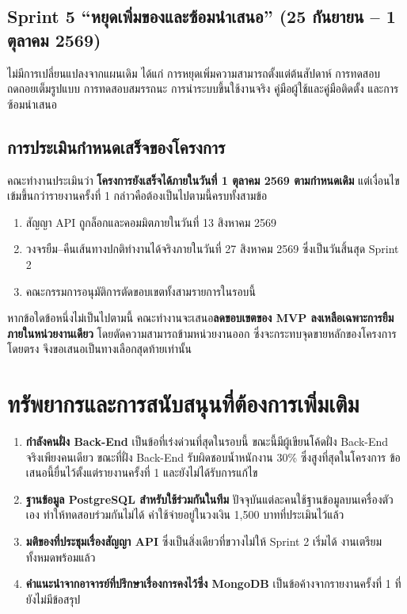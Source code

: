 \subsection{Sprint 5 ``หยุดเพิ่มของและซ้อมนำเสนอ'' (25 กันยายน – 1 ตุลาคม 2569)}

ไม่มีการเปลี่ยนแปลงจากแผนเดิม ได้แก่ การหยุดเพิ่มความสามารถตั้งแต่ต้นสัปดาห์ การทดสอบถดถอยเต็มรูปแบบ การทดสอบสมรรถนะ การนำระบบขึ้นใช้งานจริง คู่มือผู้ใช้และคู่มือติดตั้ง และการซ้อมนำเสนอ

\subsection{การประเมินกำหนดเสร็จของโครงการ}

คณะทำงานประเมินว่า \textbf{โครงการยังเสร็จได้ภายในวันที่ 1 ตุลาคม 2569 ตามกำหนดเดิม} แต่เงื่อนไขเข้มขึ้นกว่ารายงานครั้งที่ 1 กล่าวคือต้องเป็นไปตามนี้ครบทั้งสามข้อ

\begin{enumerate}
  \item สัญญา API ถูกล็อกและคอมมิตภายในวันที่ 13 สิงหาคม 2569
  \item วงจรยืม–คืนเส้นทางปกติทำงานได้จริงภายในวันที่ 27 สิงหาคม 2569 ซึ่งเป็นวันสิ้นสุด Sprint 2
  \item คณะกรรมการอนุมัติการตัดขอบเขตทั้งสามรายการในรอบนี้
\end{enumerate}

\noindent หากข้อใดข้อหนึ่งไม่เป็นไปตามนี้ คณะทำงานจะเสนอ\textbf{ลดขอบเขตของ MVP ลงเหลือเฉพาะการยืมภายในหน่วยงานเดียว} โดยตัดความสามารถข้ามหน่วยงานออก ซึ่งจะกระทบจุดขายหลักของโครงการโดยตรง จึงขอเสนอเป็นทางเลือกสุดท้ายเท่านั้น

\section{ทรัพยากรและการสนับสนุนที่ต้องการเพิ่มเติม}

\begin{enumerate}
  \item \textbf{กำลังคนฝั่ง Back-End} เป็นข้อที่เร่งด่วนที่สุดในรอบนี้ ขณะนี้มีผู้เขียนโค้ดฝั่ง Back-End จริงเพียงคนเดียว ขณะที่ฝั่ง Back-End รับผิดชอบน้ำหนักงาน 30\% ซึ่งสูงที่สุดในโครงการ ข้อเสนอนี้ยื่นไว้ตั้งแต่รายงานครั้งที่ 1 และยังไม่ได้รับการแก้ไข
  \item \textbf{ฐานข้อมูล PostgreSQL สำหรับใช้ร่วมกันในทีม} ปัจจุบันแต่ละคนใช้ฐานข้อมูลบนเครื่องตัวเอง ทำให้ทดสอบร่วมกันไม่ได้ ค่าใช้จ่ายอยู่ในวงเงิน 1{,}500 บาทที่ประเมินไว้แล้ว
  \item \textbf{มติของที่ประชุมเรื่องสัญญา API} ซึ่งเป็นสิ่งเดียวที่ขวางไม่ให้ Sprint 2 เริ่มได้ งานเตรียมทั้งหมดพร้อมแล้ว
  \item \textbf{คำแนะนำจากอาจารย์ที่ปรึกษาเรื่องการคงไว้ซึ่ง MongoDB} เป็นข้อค้างจากรายงานครั้งที่ 1 ที่ยังไม่มีข้อสรุป
\end{enumerate}

